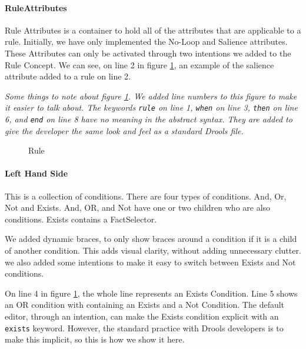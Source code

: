 \paragraph{RuleAttributes} Rule Attributes is a container to hold all of the attributes that are applicable to a rule.
Initially, we have only implemented the No-Loop and Salience attributes.
These Attributes can only be activated through two intentions we added to the Rule Concept.
We can see, on line 2 in figure \ref{fig:Rule}, an example of the salience attribute added to a rule on line 2.

\emph{Some things to note about figure \ref{fig:Rule}.
We added line numbers to this figure to make it easier to talk about.
The keywords \texttt{rule} on line 1, \texttt{when} on line 3, \texttt{then} on line 6, and \texttt{end} on line 8 have no meaning in the abstract syntax.
They are added to give the developer the same look and feel as a standard Drools file.}

\begin{figure}[h]
    \centering
    \caption{Rule}
    \label{fig:Rule}
\end{figure}

\paragraph{Left Hand Side} This is a collection of conditions.
There are four types of conditions.
And, Or, Not and Exists.
And, OR, and Not have one or two children who are also conditions.
Exists contains a FactSelector.

We added dynamic braces, to only show braces around a condition if it is a child of another condition.
This adds visual clarity, without adding unnecessary clutter.
we also added some intentions to make it easy to switch between Exists and Not conditions.

On line 4 in figure \ref{fig:Rule}, the whole line represents an Exists Condition.
Line 5 shows an OR condition with containing an Exists and a Not Condition.
The default editor, through an intention, can make the Exists condition explicit with an \texttt{exists} keyword.
However, the standard practice with Drools developers is to make this implicit, so this is how we show it here.

